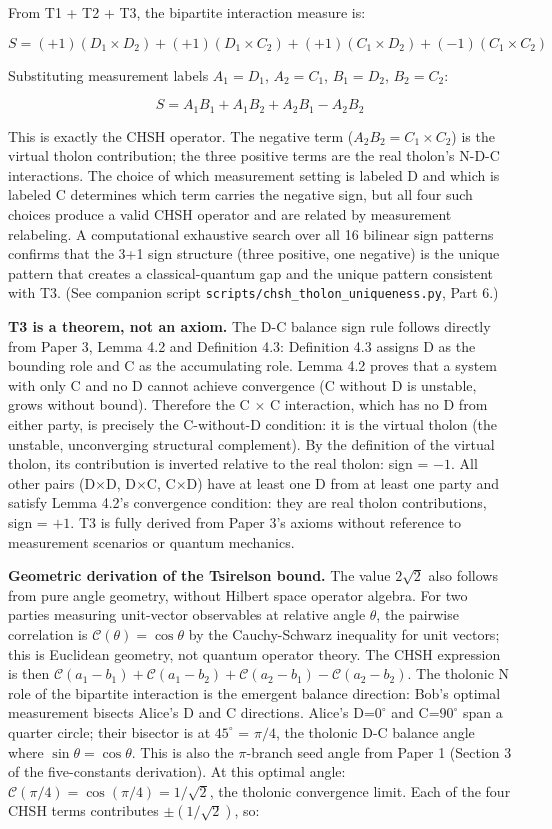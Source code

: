 \documentclass[12pt]{article}
\begin{document}
From T1 + T2 + T3, the bipartite interaction measure is:

\[S = (+1)(D_1 \times D_2) + (+1)(D_1 \times C_2) + (+1)(C_1 \times D_2) + (-1)(C_1 \times C_2)\]

Substituting measurement labels \(A_1 = D_1\), \(A_2 = C_1\),
\(B_1 = D_2\), \(B_2 = C_2\):

\[S = A_1B_1 + A_1B_2 + A_2B_1 - A_2B_2\]

This is exactly the CHSH operator. The negative term
(\(A_2B_2 = C_1 \times C_2\)) is the virtual tholon contribution; the
three positive terms are the real tholon's N-D-C interactions. The
choice of which measurement setting is labeled D and which is labeled C
determines which term carries the negative sign, but all four such
choices produce a valid CHSH operator and are related by measurement
relabeling. A computational exhaustive search over all 16 bilinear sign
patterns confirms that the 3+1 sign structure (three positive, one
negative) is the unique pattern that creates a classical-quantum gap and
the unique pattern consistent with T3. (See companion script
\texttt{scripts/chsh\_tholon\_uniqueness.py}, Part 6.)

\textbf{T3 is a theorem, not an axiom.} The D-C balance sign rule
follows directly from Paper 3, Lemma 4.2 and Definition 4.3: Definition
4.3 assigns D as the bounding role and C as the accumulating role. Lemma
4.2 proves that a system with only C and no D cannot achieve convergence
(C without D is unstable, grows without bound). Therefore the C
\(\times\) C interaction, which has no D from either party, is precisely
the C-without-D condition: it is the virtual tholon (the unstable,
unconverging structural complement). By the definition of the virtual
tholon, its contribution is inverted relative to the real tholon: sign =
\(-1\). All other pairs (D\(\times\)D, D\(\times\)C, C\(\times\)D) have
at least one D from at least one party and satisfy Lemma 4.2's
convergence condition: they are real tholon contributions, sign =
\(+1\). T3 is fully derived from Paper 3's axioms without reference to
measurement scenarios or quantum mechanics.

\textbf{Geometric derivation of the Tsirelson bound.} The value
\(2\sqrt{2}\) also follows from pure angle geometry, without Hilbert
space operator algebra. For two parties measuring unit-vector
observables at relative angle \(\theta\), the pairwise correlation is
\(\mathcal{C}(\theta) = \cos\theta\) by the Cauchy-Schwarz inequality
for unit vectors; this is Euclidean geometry, not quantum operator
theory. The CHSH expression is then
\(\mathcal{C}(a_1-b_1) + \mathcal{C}(a_1-b_2) + \mathcal{C}(a_2-b_1) - \mathcal{C}(a_2-b_2)\).
The tholonic N role of the bipartite interaction is the emergent balance
direction: Bob's optimal measurement bisects Alice's D and C directions.
Alice's D=$0^\circ$ and C=$90^\circ$ span a quarter circle; their bisector is at $45^\circ$ =
\(\pi/4\), the tholonic D-C balance angle where
\(\sin\theta = \cos\theta\). This is also the \(\pi\)-branch seed angle
from Paper 1 (Section 3 of the five-constants derivation). At this
optimal angle: \(\mathcal{C}(\pi/4) = \cos(\pi/4) = 1/\sqrt{2}\), the
tholonic convergence limit. Each of the four CHSH terms contributes
\(\pm(1/\sqrt{2})\), so:
\end{document}
